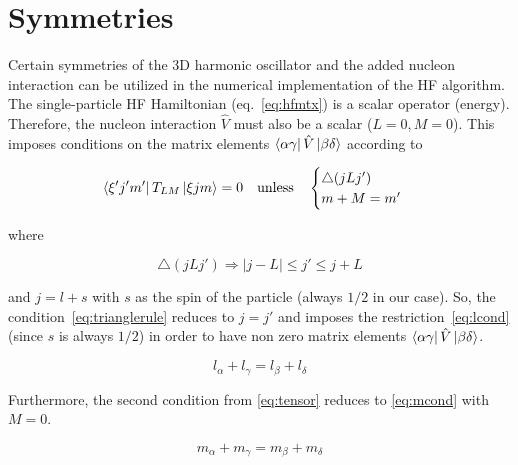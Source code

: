 \documentclass[]{scrartcl}
\begin{document}
\section*{Symmetries}

Certain symmetries of the 3D harmonic oscillator and the added nucleon interaction can be utilized in the numerical implementation of the HF algorithm. The single-particle HF Hamiltonian (eq.~\ref{eq:hfmtx}) is a scalar operator (energy). Therefore, the nucleon interaction $\hat{V}$ must also be a scalar ($L=0,M=0$). This imposes conditions on the matrix elements $\bra{\alpha \gamma} \hat{V} \ket{\beta \delta}$ according to

\begin{equation}
	\bra{\xi ' j ' m '} T _{LM} \ket{ \xi j m} = 0 \quad \mathrm{unless} \quad
		\begin{cases}
			\bigtriangleup (j L j') \\
			m + M = m'
		\end{cases}
	\label{eq:tensor}
\end{equation}

\noindent where

\begin{equation}
	\bigtriangleup (j L j') \Rightarrow \left | j - L \right | \leq j' \leq j + L
	\label{eq:trianglerule}
\end{equation}

\noindent and $j = l + s$ with $s$ as the spin of the particle (always $1/2$ in our case). So, the condition~\ref{eq:trianglerule} reduces to $j=j'$ and imposes the restriction~\ref{eq:lcond} (since $s$ is always $1/2$) in order to have non zero matrix elements $\bra{\alpha \gamma} \hat{V} \ket{\beta \delta}$.

\begin{equation}
	l _{\alpha} + l _{\gamma} = l _{\beta} + l _{\delta}
	\label{eq:lcond}
\end{equation}


Furthermore, the second condition from \ref{eq:tensor} reduces to \ref{eq:mcond} with $M=0$.

\begin{equation}
	m _{\alpha} + m _{\gamma} = m _{\beta} + m_{\delta}
	\label{eq:mcond}
\end{equation}
\end{document}
